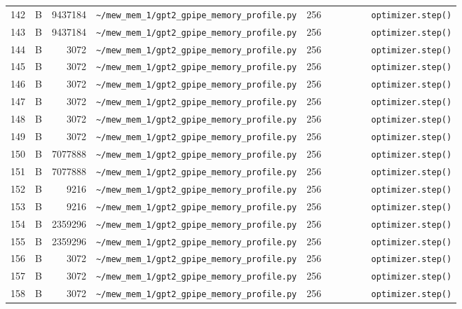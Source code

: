 \documentclass{article}
\begin{document}
\begin{longtable}{r l r p{6.5cm} r p{7.0cm}}
142 & B & 9437184 & \lstinline|~/mew_mem_1/gpt2_gpipe_memory_profile.py| & 256 & \lstinline|        optimizer.step()| \\
143 & B & 9437184 & \lstinline|~/mew_mem_1/gpt2_gpipe_memory_profile.py| & 256 & \lstinline|        optimizer.step()| \\
144 & B & 3072 & \lstinline|~/mew_mem_1/gpt2_gpipe_memory_profile.py| & 256 & \lstinline|        optimizer.step()| \\
145 & B & 3072 & \lstinline|~/mew_mem_1/gpt2_gpipe_memory_profile.py| & 256 & \lstinline|        optimizer.step()| \\
146 & B & 3072 & \lstinline|~/mew_mem_1/gpt2_gpipe_memory_profile.py| & 256 & \lstinline|        optimizer.step()| \\
147 & B & 3072 & \lstinline|~/mew_mem_1/gpt2_gpipe_memory_profile.py| & 256 & \lstinline|        optimizer.step()| \\
148 & B & 3072 & \lstinline|~/mew_mem_1/gpt2_gpipe_memory_profile.py| & 256 & \lstinline|        optimizer.step()| \\
149 & B & 3072 & \lstinline|~/mew_mem_1/gpt2_gpipe_memory_profile.py| & 256 & \lstinline|        optimizer.step()| \\
150 & B & 7077888 & \lstinline|~/mew_mem_1/gpt2_gpipe_memory_profile.py| & 256 & \lstinline|        optimizer.step()| \\
151 & B & 7077888 & \lstinline|~/mew_mem_1/gpt2_gpipe_memory_profile.py| & 256 & \lstinline|        optimizer.step()| \\
152 & B & 9216 & \lstinline|~/mew_mem_1/gpt2_gpipe_memory_profile.py| & 256 & \lstinline|        optimizer.step()| \\
153 & B & 9216 & \lstinline|~/mew_mem_1/gpt2_gpipe_memory_profile.py| & 256 & \lstinline|        optimizer.step()| \\
154 & B & 2359296 & \lstinline|~/mew_mem_1/gpt2_gpipe_memory_profile.py| & 256 & \lstinline|        optimizer.step()| \\
155 & B & 2359296 & \lstinline|~/mew_mem_1/gpt2_gpipe_memory_profile.py| & 256 & \lstinline|        optimizer.step()| \\
156 & B & 3072 & \lstinline|~/mew_mem_1/gpt2_gpipe_memory_profile.py| & 256 & \lstinline|        optimizer.step()| \\
157 & B & 3072 & \lstinline|~/mew_mem_1/gpt2_gpipe_memory_profile.py| & 256 & \lstinline|        optimizer.step()| \\
158 & B & 3072 & \lstinline|~/mew_mem_1/gpt2_gpipe_memory_profile.py| & 256 & \lstinline|        optimizer.step()| \\

\end{longtable}
\end{document}
